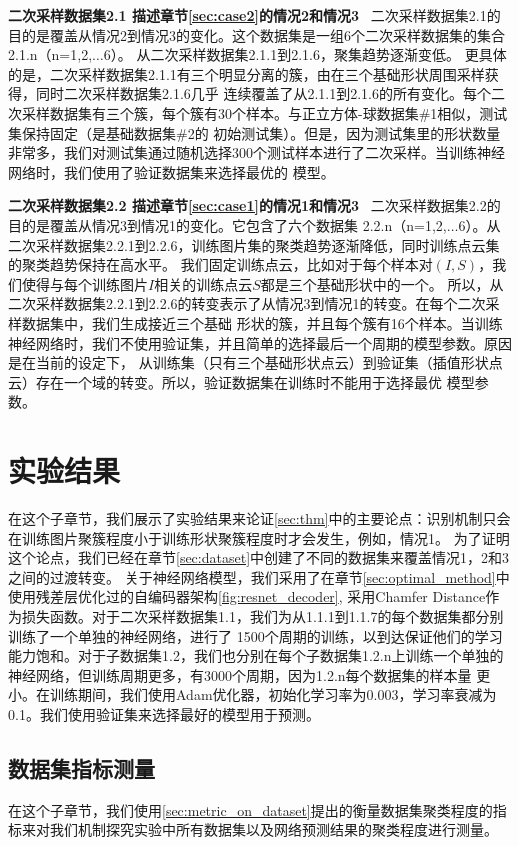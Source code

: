 \documentclass[bachelor, nocolorlinks, printoneside]{seuthesis} %
\begin{document}
\begin{Main}
\textbf{二次采样数据集2.1 描述章节\ref{sec:case2}的情况2和情况3} ~二次采样数据集2.1的目的是覆盖从情况2到情况3的变化。这个数据集是一组6个二次采样数据集的集合2.1.n（n=1,2,$\ldots$6）。
从二次采样数据集2.1.1到2.1.6，聚集趋势逐渐变低。
更具体的是，二次采样数据集2.1.1有三个明显分离的簇，由在三个基础形状周围采样获得，同时二次采样数据集2.1.6几乎
连续覆盖了从2.1.1到2.1.6的所有变化。每个二次采样数据集有三个簇，每个簇有30个样本。与正立方体-球数据集$\#$1相似，测试集保持固定（是基础数据集$\#$2的
初始测试集）。但是，因为测试集里的形状数量非常多，我们对测试集通过随机选择300个测试样本进行了二次采样。当训练神经网络时，我们使用了验证数据集来选择最优的
模型。

\textbf{二次采样数据集2.2 描述章节\ref{sec:case1}的情况1和情况3} ~二次采样数据集2.2的目的是覆盖从情况3到情况1的变化。它包含了六个数据集
2.2.n（n=1,2,$\ldots$6）。从二次采样数据集2.2.1到2.2.6，训练图片集的聚类趋势逐渐降低，同时训练点云集的聚类趋势保持在高水平。
我们固定训练点云，比如对于每个样本对$(I,S)$，我们使得与每个训练图片$I$相关的训练点云$S$都是三个基础形状中的一个。
所以，从二次采样数据集2.2.1到2.2.6的转变表示了从情况3到情况1的转变。在每个二次采样数据集中，我们生成接近三个基础
形状的簇，并且每个簇有16个样本。当训练神经网络时，我们不使用验证集，并且简单的选择最后一个周期的模型参数。原因是在当前的设定下，
从训练集（只有三个基础形状点云）到验证集（插值形状点云）存在一个域的转变。所以，验证数据集在训练时不能用于选择最优
模型参数。


\section{实验结果}
在这个子章节，我们展示了实验结果来论证\ref{sec:thm}中的主要论点：识别机制只会在训练图片聚簇程度小于训练形状聚簇程度时才会发生，例如，情况1。
为了证明这个论点，我们已经在章节\ref{sec:dataset}中创建了不同的数据集来覆盖情况1，2和3之间的过渡转变。
关于神经网络模型，我们采用了在章节\ref{sec:optimal_method}中使用残差层优化过的自编码器架构\ref{fig:resnet_decoder},
采用Chamfer Distance作为损失函数。对于二次采样数据集1.1，我们为从1.1.1到1.1.7的每个数据集都分别训练了一个单独的神经网络，进行了
1500个周期的训练，以到达保证他们的学习能力饱和。对于子数据集1.2，我们也分别在每个子数据集1.2.n上训练一个单独的神经网络，但训练周期更多，有3000个周期，因为1.2.n每个数据集的样本量
更小。在训练期间，我们使用Adam优化器，初始化学习率为0.003，学习率衰减为0.1。我们使用验证集来选择最好的模型用于预测。

\subsection{数据集指标测量}\label{sec:metric_result}
在这个子章节，我们使用\ref{sec:metric_on_dataset}提出的衡量数据集聚类程度的指标来对我们机制探究实验中所有数据集以及网络预测结果的聚类程度进行测量。


\end{Main}
\end{document}
